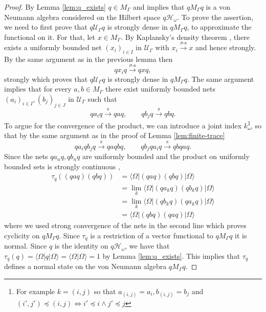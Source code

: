 \documentclass[aps,pra,reprint,superscriptaddress]{revtex4-2}
\newcommand{\cH}{{\mathcal H}}
\newcommand{\cU}{{\mathcal U}}
\newcommand\G{\Gamma}
\renewcommand\t{\tau}
\newcommand\w{\omega}
\newcommand\W{\Omega}
\providecommand{\ket}[1]{\lvert #1\rangle}
\providecommand{\bra}[1]{\langle #1\rvert}
\theoremstyle{definition}
\theoremstyle{remark}
\begin{document}
\begin{proof}
By Lemma \ref{lem:q_exists} $q \in M_\G$ and \cite[I.9.1.4]{Blackadar} implies
that $qM_\G q$ is a von
Neumann algebra considered on the Hilbert space $q \cH_\w$.
To prove the assertion, we need to first prove that $q \cU_\G q$ is strongly
dense in $q M_\G q$, to approximate the functional on it.
For that, let $x \in M_\G$. By Kaplansky's density theorem
\cite[I.9.1.3]{Blackadar}, there exists a uniformly bounded net $(x_i)_{i\in I}$ in $\cU_\G$ with $x_i \xrightarrow{\sigma\text{-}\mathrm{s}} x$ and hence
strongly. By the same argument as in the previous lemma then
\begin{equation}
    q x_i q \xrightarrow{\sigma\text{-}\mathrm{s}} q x q,
\end{equation}
strongly which proves that $q \cU_\G q$ is strongly dense in $q M_\G q$. The
same argument implies that for every $a,b \in M_\G$ there exist uniformly bounded nets $(a_i)_{i\in I},(b_j)_{j\in J}$ in $\cU_\G$ such that
\begin{equation}
   q a_i q \xrightarrow{\mathrm{s}} q a q,
   \qquad
   q b_j q \xrightarrow{\mathrm{s}} q b q.
\end{equation}
To argue for the convergence of the product, we can introduce a joint index $k$\footnote{For example $k
    = (i,j)$ so that $a_{(i,j)} = a_i, b_{(i,j)} = b_j$ and $(i',j') \preceq (i,j)
    \Leftrightarrow i' \preceq i \land j' \preceq j$},
so that by the same argument as in the proof of Lemma \ref{lem:finite-trace}
\begin{equation}
    q a_i q b_j q \xrightarrow{\mathrm{s}} q a q b q,
    \qquad
    q b_j q a_i q \xrightarrow{\mathrm{s}} q b q a q.
\end{equation}
Since the nets $q a_n q, q
b_n q$ are uniformly bounded and the product on uniformly bounded sets is
strongly continuous \cite{Blackadar,TakesakiI},
\begin{equation}
    \begin{aligned}
        \t_q( (q a q ) (q b q)) &= \bra{\W}  (q a q ) (q b q)\ket{\W} \\
                                & = \lim_k\bra{\W}  (q a_k
                                q ) (q b_k q)\ket{\W} \\
                                & = \lim_k\bra{\W}  (q b_k
                                q ) (q a_k q)\ket{\W} \\
                                &= \bra{\W}  (q b q ) (q a q)\ket{\W}
    \end{aligned}
\end{equation}
where we used strong convergence of the nets in the second line which proves
cyclicity on $q M_\G q$. Since $\t_q$ is a restriction of a vector functional
to $qM_\G q$ it is normal. Since $q$ is the identity on $q\cH_\w$, we have that $\tau_q(q) =\bra{\W} q \ket{\W} = \langle \W | \W \rangle = 1$ by Lemma \ref{lem:q_exists}.
This implies that $\t_q$ defines a normal state on the von Neumann algebra $qM_\G q$. 
\end{proof}
\end{document}
